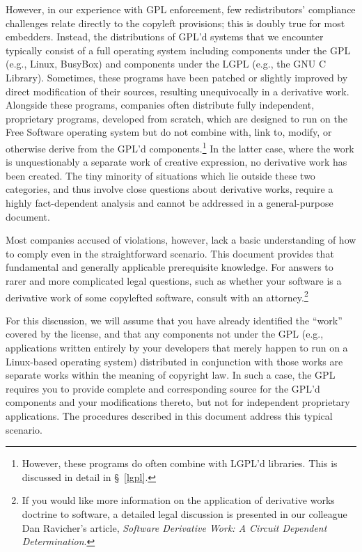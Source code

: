 However, in our experience with GPL enforcement, few redistributors'
compliance challenges relate directly to the copyleft provisions; this is
doubly true for most embedders.  Instead, the distributions of GPL'd
systems that we encounter typically consist of a full operating system
including components under the GPL (e.g., Linux, BusyBox) and components
under the LGPL (e.g., the GNU C Library).  Sometimes, these programs have
been patched or slightly improved by direct modification of their sources,
resulting unequivocally in a derivative work.  Alongside these programs,
companies often distribute fully independent, proprietary programs,
developed from scratch, which are designed to run on the Free Software operating
system but do not combine with, link to, modify, or otherwise derive from
the GPL'd components.\footnote{However, these programs do often combine
  with LGPL'd libraries. This is discussed in detail in \S~\ref{lgpl}.}
In the latter case, where the work is unquestionably a separate work of
creative expression, no derivative work has been created.  The tiny
minority of situations which lie outside these two categories, and thus
involve close questions about derivative works, require a highly
fact-dependent analysis and cannot be addressed in a general-purpose
document.

Most companies accused of violations, however, lack a basic understanding
of how to comply even in the straightforward scenario.  This document
provides that fundamental and generally applicable prerequisite knowledge.
For answers to rarer and more complicated legal questions, such as whether
your software is a derivative work of some copylefted software, consult
with an attorney.\footnote{If you would like more information on the
  application of derivative works doctrine to software, a detailed legal
  discussion is presented in our colleague Dan Ravicher's article,
  \textit{Software Derivative Work: A Circuit Dependent Determination}.}

For this discussion, we will assume that you have already identified the
``work'' covered by the license, and that any components not under the GPL
(e.g., applications written entirely by your developers that merely happen
to run on a Linux-based operating system) distributed in conjunction with
those works are separate works within the meaning of copyright law.  In
such a case, the GPL requires you to provide complete and corresponding
source for the GPL'd components and your modifications thereto, but not
for independent proprietary applications.  The procedures described in
this document address this typical scenario.

